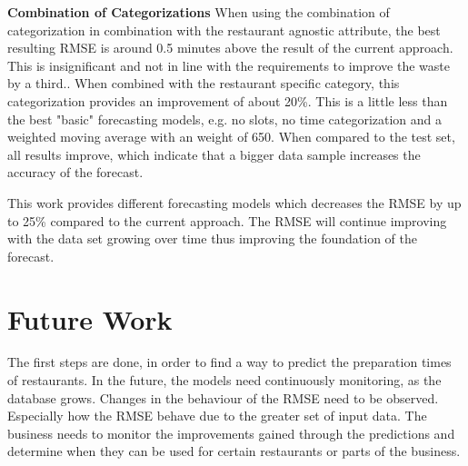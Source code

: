 \newline\textbf{Combination of Categorizations}\newline
When using the combination of categorization in combination with the restaurant agnostic attribute, the best resulting RMSE is around 0.5 minutes above the result of the current approach. This is insignificant and not in line with the requirements to improve the waste by a third..\newline
When combined with the restaurant specific category, this categorization provides an improvement of about 20\%. This is a little less than the best "basic" forecasting models, e.g. no slots, no time categorization and a weighted moving average with an weight of 650. When compared to the test set, all results improve, which indicate that a bigger data sample increases the accuracy of the forecast.

\newline\newline
This work provides different forecasting models which decreases the RMSE by up to 25\% compared to the current approach. The RMSE will continue improving with the data set growing over time thus improving the foundation of the forecast.
\section{Future Work}
The first steps are done, in order to find a way to predict the preparation times of restaurants. In the future, the models need continuously monitoring, as the database grows. Changes in the behaviour of the RMSE need to be observed. Especially how the RMSE behave due to the greater set of input data.\newline
The business needs to monitor the improvements gained through the predictions and determine when they can be used for certain restaurants or parts of the business.
